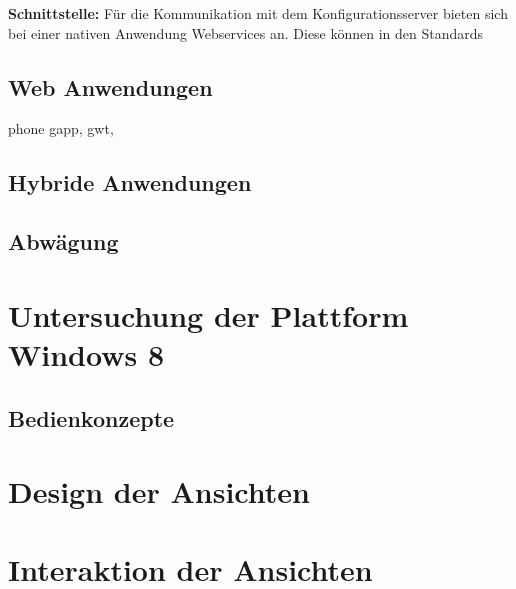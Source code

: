 \textbf{Schnittstelle:} Für die Kommunikation mit dem Konfigurationsserver bieten sich bei einer nativen Anwendung Webservices an. Diese können in den Standards 
\subsection{Web Anwendungen}
phone gapp, gwt, 
\subsection{Hybride Anwendungen}
\subsection{Abwägung}

\section{Untersuchung der Plattform Windows 8}
\subsection{Bedienkonzepte}



\section{Design der Ansichten}

\section{Interaktion der Ansichten}